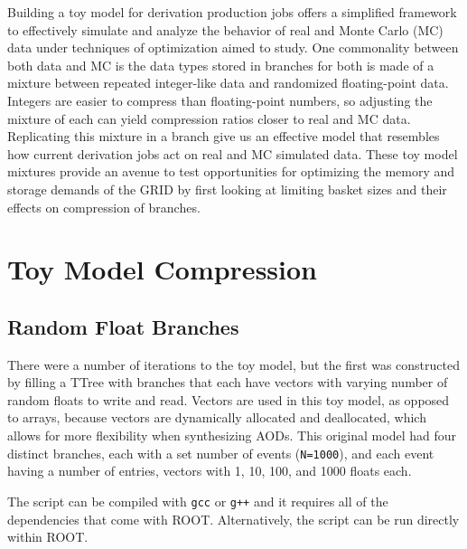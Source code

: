 Building a toy model for derivation production jobs offers a simplified framework to effectively simulate and analyze the behavior of real and Monte Carlo (MC) data under techniques of optimization aimed to study.
One commonality between both data and MC is the data types stored in branches for both is made of a mixture between repeated integer-like data and randomized floating-point data. 
Integers are easier to compress than floating-point numbers, so adjusting the mixture of each can yield compression ratios closer to real and MC data.  
Replicating this mixture in a branch give us an effective model that resembles how current derivation jobs act on real and MC simulated data. 
These toy model mixtures provide an avenue to test opportunities for optimizing the memory and storage demands of the GRID by first looking at limiting basket sizes and their effects on compression of branches. 


\section{Toy Model Compression}

\subsection{Random Float Branches} \label{sec:toy_compression_random_float_branches}
There were a number of iterations to the toy model, but the first was constructed by filling a TTree with branches that each have vectors with varying number of random floats to write and read.
Vectors are used in this toy model, as opposed to arrays, because vectors are dynamically allocated and deallocated, which allows for more flexibility when synthesizing AODs. 
This original model had four distinct branches, each with a set number of events (\verb|N=1000|), and each event having a number of entries, vectors with 1, 10, 100, and 1000 floats each.

The script can be compiled with \verb|gcc| or \verb|g++| and it requires all of the dependencies that come with ROOT. 
Alternatively, the script can be run directly within ROOT.
  
